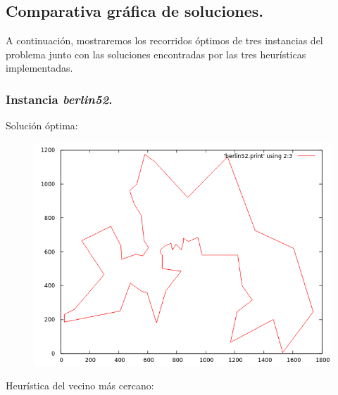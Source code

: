 \documentclass[11pt,a4paper]{article}
\begin{document}
\newpage

		\subsection{Comparativa gráfica de soluciones.}

			\par
			A continuación, mostraremos los recorridos óptimos de tres instancias del problema junto con las soluciones encontradas por las tres heurísticas implementadas.

			\subsubsection{Instancia \textit{berlin52}.}

				\par
				Solución óptima:

				\vspace{5mm}

				\begin{figure}[h]

					\centering
					\includegraphics[width=1\textwidth]{berlin52OPT.png}
					
				\end{figure}

\newpage

				\par
				Heurística del vecino más cercano:

				\vspace{5mm}
\end{document}
